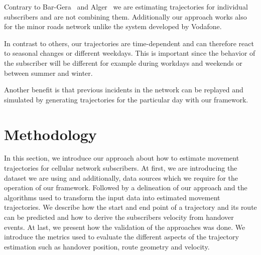 \documentclass[twocolumn]{bmcart}%
\begin{document}
Contrary to Bar-Gera~\cite{Bar2007} and Alger~\cite{Alger2004} we are estimating trajectories for individual subscribers and are not combining them. Additionally our approach works also for the minor roads network unlike the system developed by Vodafone.

In contrast to others, our trajectories are time-dependent and can therefore react to seasonal changes or different weekdays. This is important since the behavior of the subscriber will be different for example during workdays and weekends or between summer and winter.

Another benefit is that previous incidents in the network can be replayed and simulated by generating trajectories for the particular day with our framework.


\section*{Methodology}

In this section, we introduce our approach about how to estimate movement trajectories for cellular network subscribers. At first, we are introducing the dataset we are using and additionally, data sources which we require for the operation of our framework. Followed by a delineation of our approach and the algorithms used to transform the input data into estimated movement trajectories. We describe how the start and end point of a trajectory and its route can be predicted and how to derive the subscribers velocity from handover events. At last, we present how the validation of the approaches was done. We introduce the metrics used to evaluate the different aspects of the trajectory estimation such as handover position, route geometry and velocity. 

\end{document}
